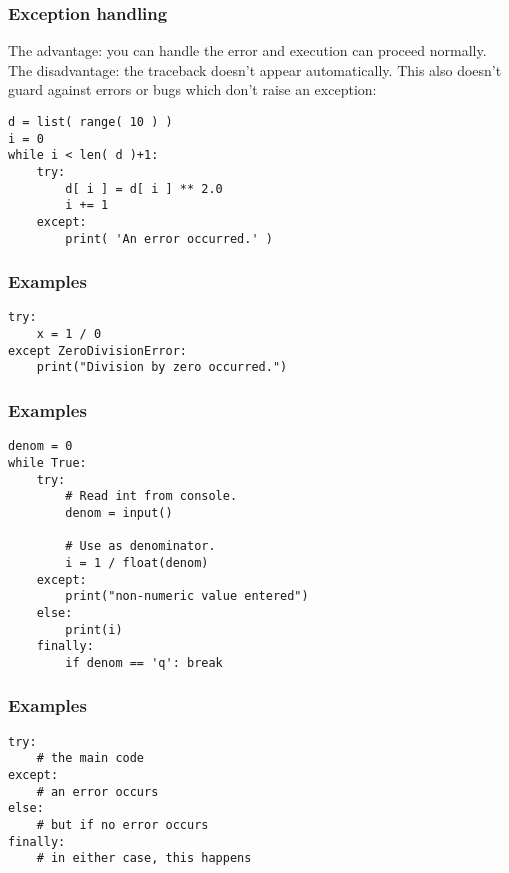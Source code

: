 \documentclass[11pt]{beamer}
\begin{document}
\begin{frame}[fragile]
  \frametitle{Exception handling}
  \Enlarge

  \begin{enumerate}
  \myitem  The advantage:  you can handle the error and execution can proceed normally.
  \myitem  The disadvantage:  the traceback doesn't appear automatically. \pause
  \myitem  This also doesn't guard against errors or bugs which don't raise an exception:
  \end{enumerate}
  \begin{Verbatim}
d = list( range( 10 ) )
i = 0
while i < len( d )+1:
    try:
        d[ i ] = d[ i ] ** 2.0
        i += 1
    except:
        print( 'An error occurred.' )
  \end{Verbatim}
\end{frame}

\begin{frame}[fragile]
  \frametitle{Examples}
  \Enlarge

  \begin{Verbatim}
try:
    x = 1 / 0
except ZeroDivisionError:
    print("Division by zero occurred.")
  \end{Verbatim}
\end{frame}

\begin{frame}[fragile]
  \frametitle{Examples}
  \Enlarge

  \begin{Verbatim}
denom = 0
while True:
    try:
        # Read int from console.
        denom = input()

        # Use as denominator.
        i = 1 / float(denom)
    except:
        print("non-numeric value entered")
    else:
        print(i)
    finally:
        if denom == 'q': break
  \end{Verbatim}
\end{frame}

\begin{frame}[fragile]
  \frametitle{Examples}
  \Enlarge

  \begin{Verbatim}
try:
    # the main code
except:
    # an error occurs
else:
    # but if no error occurs
finally:
    # in either case, this happens
  \end{Verbatim}
\end{frame}
\end{document}
